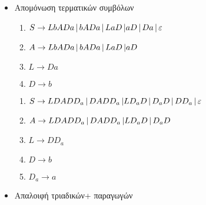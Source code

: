 \begin{tcolorbox}[colback=yellow!15!white, colframe=blue!50!white,
	fonttitle=\bfseries\Large, title = Μετατροπή $CFG\rightarrow CNF$ 2/3]

	\begin{itemize}
		\itemsep0em

		\item Απομόνωση τερματικών συμβόλων
		\reducevspace\reducevspace\reducevspace\reducevspace\reducevspace\reducevspace\reducevspace\reducevspace

		\begin{minipage}[t]{0.5\textwidth}
			\begin{enumerate}
				\item $S\rightarrow LbADa \,|\, bADa \,|\, LaD \,|\\
									aD \,|\, Da \,|\, \varepsilon$
				\reducevspace
				\item $A\rightarrow LbADa \,|\, bADa \,|\, LaD \,|\\
									aD$
				\reducevspace
				\item $L\rightarrow Da$
				\reducevspace
				\item $D\rightarrow b$
			\end{enumerate}
		\end{minipage}%
		\hfill
		\begin{minipage}[t]{0.5\textwidth}
			\begin{enumerate}
				\item $S\rightarrow LDADD_a \,|\, DADD_a \,|\\
				LD_aD \,|\, D_aD \,|\, DD_a \,|\, \varepsilon$
				\reducevspace
				\item $A\rightarrow LDADD_a \,|\, DADD_a \,|\\
				LD_aD \,|\, D_aD$
				\reducevspace
				\item $L\rightarrow DD_a$
				\reducevspace
				\item $D\rightarrow b$
				\reducevspace
				\item $D_a\rightarrow a$
			\end{enumerate}
		\end{minipage}

		\bigskip \smallskip
		\item Απαλοιφή τριαδικών+ παραγωγών
		\reducevspace\reducevspace\reducevspace\reducevspace\reducevspace\reducevspace\reducevspace\reducevspace


\end{itemize}
\end{tcolorbox}
